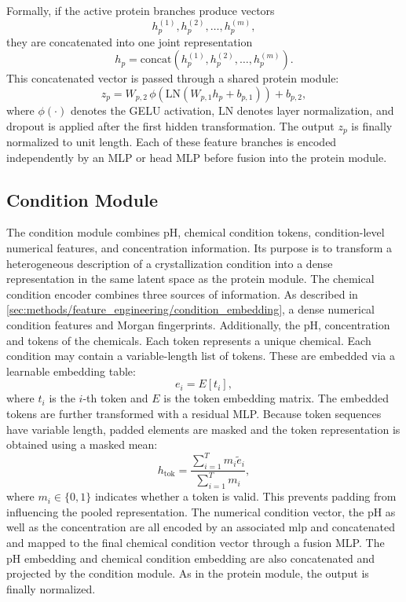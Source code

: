 Formally, if the active protein branches produce vectors
\begin{equation}
    h^{(1)}_p, h^{(2)}_p, \dots, h^{(m)}_p,
\end{equation}
they are concatenated into one joint representation
\begin{equation}
    h_p = \mathrm{concat}\!\left(h^{(1)}_p, h^{(2)}_p, \dots, h^{(m)}_p\right).
\end{equation}
This concatenated vector is passed through a shared protein module:
\begin{equation}
    z_p = W_{p,2} \, \phi\!\left(\mathrm{LN}\!\left(W_{p,1} h_p + b_{p,1}\right)\right) + b_{p,2},
\end{equation}
where $\phi(\cdot)$ denotes the GELU activation, $\mathrm{LN}$ denotes layer normalization, and dropout is applied after the first hidden transformation. The output $z_p$ is finally normalized to unit length. Each of these feature branches is encoded independently by an MLP or head MLP before fusion into the protein module.

\subsection{Condition Module}

The condition module combines pH, chemical condition tokens, condition-level numerical features, and concentration information. Its purpose is to transform a heterogeneous description of a crystallization condition into a dense representation in the same latent space as the protein module.
The chemical condition encoder combines three sources of information. As described in \autoref{sec:methods/feature_engineering/condition_embedding}, a dense numerical condition features and Morgan fingerprints. Additionally, the pH, concentration and tokens of the chemicals.
Each token represents a unique chemical. Each condition may contain a variable-length list of tokens. These are embedded via a learnable embedding table:
\begin{equation}
    e_i = E[t_i],
\end{equation}
where $t_i$ is the $i$-th token and $E$ is the token embedding matrix. The embedded tokens are further transformed with a residual MLP. Because token sequences have variable length, padded elements are masked and the token representation is obtained using a masked mean:
\begin{equation}
    h_{\text{tok}} =
    \frac{\sum_{i=1}^{T} m_i \tilde{e}_i}{\sum_{i=1}^{T} m_i},
\end{equation}
where $m_i \in \{0,1\}$ indicates whether a token is valid. This prevents padding from influencing the pooled representation.
The numerical condition vector, the pH as well as the concentration are all encoded by an associated \gls{mlp} and concatenated and mapped to the final chemical condition vector through a fusion MLP.
The pH embedding and chemical condition embedding are also concatenated and projected by the condition module.
As in the protein module, the output is finally normalized.

